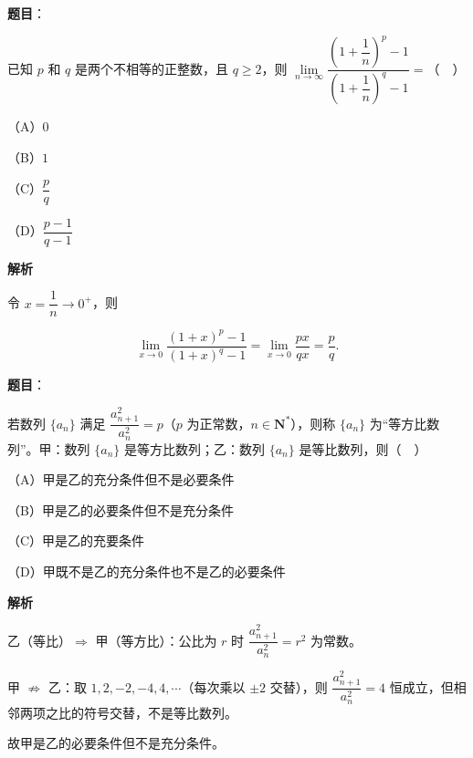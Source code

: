 \begin{answer}

\textbf{题目}：

已知 $p$ 和 $q$ 是两个不相等的正整数，且 $q\geqslant2$，则 $\lim\limits_{n\to\infty}\dfrac{\left(1+\dfrac1n\right)^p-1}{\left(1+\dfrac1n\right)^q-1}=$（　）

（A）$0$

（B）$1$

（C）$\dfrac pq$

（D）$\dfrac{p-1}{q-1}$

\textbf{解析}

令 $x=\dfrac1n\to0^+$，则

\nopagebreak[4]
\[\lim_{x\to0}\frac{(1+x)^p-1}{(1+x)^q-1}=\lim_{x\to0}\frac{px}{qx}=\frac pq.\]


\end{answer}
\begin{answer}

\textbf{题目}：

若数列 $\{a_n\}$ 满足 $\dfrac{a_{n+1}^2}{a_n^2}=p$（$p$ 为正常数，$n\in\mathbf N^*$），则称 $\{a_n\}$ 为“等方比数列”。甲：数列 $\{a_n\}$ 是等方比数列；乙：数列 $\{a_n\}$ 是等比数列，则（　）

（A）甲是乙的充分条件但不是必要条件

（B）甲是乙的必要条件但不是充分条件

（C）甲是乙的充要条件

（D）甲既不是乙的充分条件也不是乙的必要条件

\textbf{解析}

乙（等比）$\Rightarrow$ 甲（等方比）：公比为 $r$ 时 $\dfrac{a_{n+1}^2}{a_n^2}=r^2$ 为常数。

甲 $\nRightarrow$ 乙：取 $1,2,-2,-4,4,\cdots$（每次乘以 $\pm2$ 交替），则 $\dfrac{a_{n+1}^2}{a_n^2}=4$ 恒成立，但相邻两项之比的符号交替，不是等比数列。

故甲是乙的必要条件但不是充分条件。


\end{answer}
